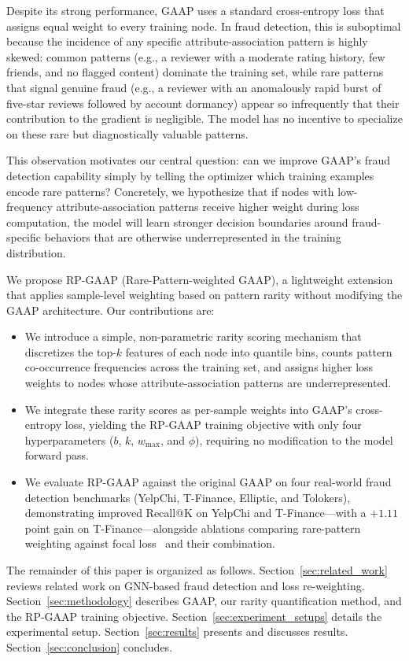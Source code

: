 Despite its strong performance, GAAP uses a standard cross-entropy loss that assigns equal weight to every training node. In fraud detection, this is suboptimal because the incidence of any specific attribute-association pattern is highly skewed: common patterns (e.g., a reviewer with a moderate rating history, few friends, and no flagged content) dominate the training set, while rare patterns that signal genuine fraud (e.g., a reviewer with an anomalously rapid burst of five-star reviews followed by account dormancy) appear so infrequently that their contribution to the gradient is negligible. The model has no incentive to specialize on these rare but diagnostically valuable patterns.

This observation motivates our central question: can we improve GAAP's fraud detection capability simply by telling the optimizer which training examples encode rare patterns? Concretely, we hypothesize that if nodes with low-frequency attribute-association patterns receive higher weight during loss computation, the model will learn stronger decision boundaries around fraud-specific behaviors that are otherwise underrepresented in the training distribution.

We propose RP-GAAP (Rare-Pattern-weighted GAAP), a lightweight extension that applies sample-level weighting based on pattern rarity without modifying the GAAP architecture. Our contributions are:

\begin{itemize}
    \item We introduce a simple, non-parametric rarity scoring mechanism that discretizes the top-$k$ features of each node into quantile bins, counts pattern co-occurrence frequencies across the training set, and assigns higher loss weights to nodes whose attribute-association patterns are underrepresented.
    \item We integrate these rarity scores as per-sample weights into GAAP's cross-entropy loss, yielding the RP-GAAP training objective with only four hyperparameters ($b$, $k$, $w_{\text{max}}$, and $\phi$), requiring no modification to the model forward pass.
    \item We evaluate RP-GAAP against the original GAAP on four real-world fraud detection benchmarks (YelpChi, T-Finance, Elliptic, and Tolokers), demonstrating improved Recall@K on YelpChi and T-Finance---with a $+1.11$ point gain on T-Finance---alongside ablations comparing rare-pattern weighting against focal loss~\cite{lin2017focal} and their combination.
\end{itemize}

The remainder of this paper is organized as follows. Section~\ref{sec:related_work} reviews related work on GNN-based fraud detection and loss re-weighting. Section~\ref{sec:methodology} describes GAAP, our rarity quantification method, and the RP-GAAP training objective. Section~\ref{sec:experiment_setups} details the experimental setup. Section~\ref{sec:results} presents and discusses results. Section~\ref{sec:conclusion} concludes.
